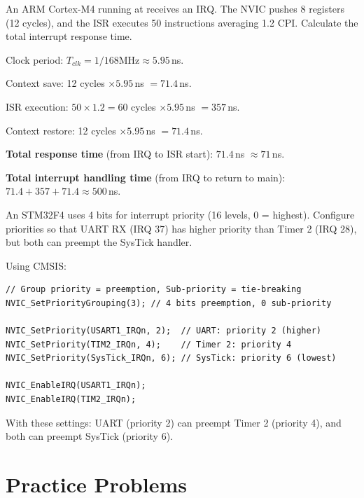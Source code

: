 \begin{example}
An ARM Cortex-M4 running at  receives an IRQ. The NVIC pushes 8 registers (12 cycles), and the ISR executes 50 instructions averaging 1.2 CPI. Calculate the total interrupt response time.

\begin{solution}
Clock period: $T_{clk} = 1/168\text{MHz} \approx 5.95\,$ns.

Context save: 12 cycles $\times 5.95\,$ns $= 71.4\,$ns.

ISR execution: $50 \times 1.2 = 60$ cycles $\times 5.95\,$ns $= 357\,$ns.

Context restore: 12 cycles $\times 5.95\,$ns $= 71.4\,$ns.

\textbf{Total response time} (from IRQ to ISR start): $71.4\,$ns $\approx 71\,$ns.

\textbf{Total interrupt handling time} (from IRQ to return to main): $71.4 + 357 + 71.4 \approx 500\,$ns.
\end{solution}
\end{example}

\begin{example}
An STM32F4 uses 4 bits for interrupt priority (16 levels, 0 = highest). Configure priorities so that UART RX (IRQ 37) has higher priority than Timer 2 (IRQ 28), but both can preempt the SysTick handler.

\begin{solution}
Using CMSIS:
\begin{lstlisting}[style=C, numbers=none]
// Group priority = preemption, Sub-priority = tie-breaking
NVIC_SetPriorityGrouping(3); // 4 bits preemption, 0 sub-priority

NVIC_SetPriority(USART1_IRQn, 2);  // UART: priority 2 (higher)
NVIC_SetPriority(TIM2_IRQn, 4);    // Timer 2: priority 4
NVIC_SetPriority(SysTick_IRQn, 6); // SysTick: priority 6 (lowest)

NVIC_EnableIRQ(USART1_IRQn);
NVIC_EnableIRQ(TIM2_IRQn);
\end{lstlisting}
With these settings: UART (priority 2) can preempt Timer 2 (priority 4), and both can preempt SysTick (priority 6).
\end{solution}
\end{example}

\section{Practice Problems}
\label{sec:arch:practice}

